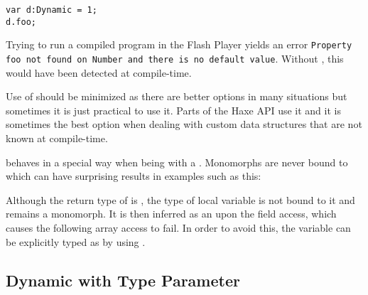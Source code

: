 \begin{lstlisting}
var d:Dynamic = 1;
d.foo;
\end{lstlisting}

Trying to run a compiled program in the Flash Player yields an error \texttt{Property foo not found on Number and there is no default value}. Without , this would have been detected at compile-time.


Use of  should be minimized as there are better options in many situations but sometimes it is just practical to use it. Parts of the Haxe  API use it and it is sometimes the best option when dealing with custom data structures that are not known at compile-time.

 behaves in a special way when being  with a . Monomorphs are never bound to  which can have surprising results in examples such as this:


Although the return type of  is , the type of local variable  is not bound to it and remains a monomorph. It is then inferred as an  upon the  field access, which causes the following  array access to fail. In order to avoid this, the variable  can be explicitly typed as  by using .


\subsection{Dynamic with Type Parameter}
\label{types-dynamic-with-type-parameter}

